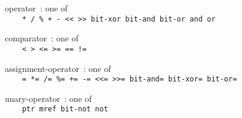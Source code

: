 \documentclass[a4]{article}
\def\|{\verb|} %|
\begin{document}
\noindent
operator{\rm \ :} {\rm one of} \\ \tt
\|  | * / \% + - << >> bit-xor bit-and bit-or and or \\ \it

\noindent
comparator{\rm \ :} {\rm one of} \\ \tt
\|  | < > <= >= == != \\ \it

\noindent
assignment-operator{\rm \ :} {\rm one of} \\ \tt
\|  | = *= /= \%= += -= <<= >>= bit-and= bit-xor= bit-or= \\ \it

\noindent
unary-operator{\rm \ :} {\rm one of} \\ \tt
\|  | ptr mref bit-not not \\ \it

\rm
\end{document}
